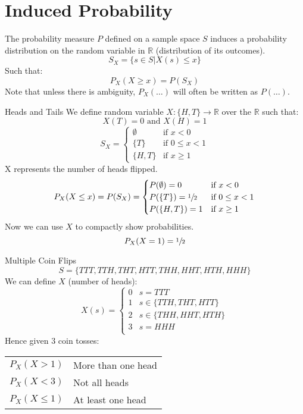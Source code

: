 \section{Induced Probability}
The probability measure $P$ defined on a sample space $S$ induces a probability distribution on the random variable in $\mathbb{R}$ (distribution of its outcomes).
\[S_X = \{s \in S | X(s) \leq x\}\]
Such that:
\[P_X(X \geq x) = P(S_X)\]
Note that unless there is ambiguity, $P_X(\dots)$ will often be written as $P(\dots)$.
\begin{examplebox}{Heads and Tails}
	We define random variable $X : \{H,T\} \to \mathbb{R}$  over the  $\mathbb{R}$ such that:
	\[X(T) = 0 \text{ and } X(H) = 1\]
	\[S_X = \begin{cases}
			\emptyset & \text{if }x < 0         \\
			\{T\}     & \text{if } 0 \leq x < 1 \\
			\{H,T\}   & \text{if } x \geq 1
		\end{cases}\]
	X represents the number of heads flipped.
	\[P_X(X \leq x) = P(S_X) = \begin{cases}
			P(\emptyset) = 0        & \text{if } x < 0        \\
			P(\{T\}) = \sfrac{1}{2} & \text{if } 0 \leq x < 1 \\
			P(\{H,T\}) = 1          & \text{if } x \geq 1     \\
		\end{cases}\]
	Now we can use $X$ to compactly show probabilities.
	\[P_X(X =1) = \sfrac{1}{2}\]
\end{examplebox}

\begin{examplebox}{Multiple Coin Flips}
	\[S = \{TTT,TTH,THT,HTT,THH,HHT,HTH,HHH\}\]
	We can define $X$ (number of heads):
	\[X(s) = \begin{cases}
			0 & s = TTT               \\
			1 & s \in \{TTH,THT,HTT\} \\
			2 & s \in \{THH,HHT,HTH\} \\
			3 & s = HHH               \\
		\end{cases}\]
	Hence given 3 coin tosses:
	\begin{center}
		\begin{tabular}{c l}
			$P_X(X > 1)$    & More than one head \\
			$P_X(X < 3)$    & Not all heads      \\
			$P_X(X \leq 1)$ & At least one head  \\
		\end{tabular}
	\end{center}
\end{examplebox}

